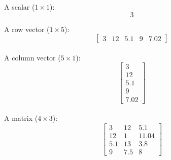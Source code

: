 \documentclass[12pt,a4paper]{article}
\begin{document}

A scalar ($1 \times 1$):
\[3\]

A row vector ($1 \times 5$):
\[ \left[ \begin{array}{ccccc}
3 & 12 & 5.1 & 9 & 7.02 \end{array} \right]\]\\

A column vector ($5 \times 1$):
\[ \left[ \begin{array}{c}
3 \\
12 \\
5.1 \\
9 \\
7.02 \end{array} \right]\]\\

A matrix ($4 \times 3$):
\[ \left[ \begin{array}{ccc}
3 & 12 & 5.1\\
12 & 1 & 11.04\\
5.1 & 13 & 3.8\\
9 & 7.5 & 8 \end{array} \right]\]\\
\end{document}
